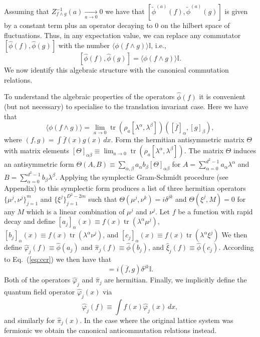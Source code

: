 \documentclass[prl,twocolumn,lengthcheck,superscriptaddress]{revtex4-1}
\newcommand{\tr}{\operatorname{tr}}
\theoremstyle{definition}
\theoremstyle{remark}
\begin{document}
Assuming that ${Z_{f\wedge g}^{-1}(a)} \underset{a\rightarrow 0}{\rightarrow} 0$ we have that $[\widetilde{\phi}^{(a)}(f), \widetilde{\phi}^{(a)}(g)]$ is given by a constant term plus an operator decaying to $0$ on the hilbert space of fluctuations. Thus, in any expectation value, we can replace any commutator $[\widehat{\phi}(f), \widehat{\phi}(g)]$ with the number $\langle \phi(f\wedge g)\rangle \mathbb{I}$, i.e., 
\begin{equation}\label{eq:ccr}
	[\widehat{\phi}(f), \widehat{\phi}(g)] = \langle \phi(f\wedge g)\rangle \mathbb{I}.
\end{equation}
We now identify this algebraic structure with the canonical commutation relations. 

To understand the algebraic properties of the operators $\widehat{\phi}(f)$ it is convenient (but not necessary) to specialise to the translation invariant case. Here we have that 
\begin{equation}
	\langle \phi(f\wedge g)\rangle = \lim_{a\rightarrow 0} \tr(\rho_a [\lambda^\alpha,\lambda^\beta]) ([\overline{f}]_\alpha,[g]_\beta), 
\end{equation}
where $(f,g) = \int \overline{f}(x)g(x)\,dx$.
 Form the hermitian antisymmetric matrix $\Theta$ with matrix elements $[\Theta]_{\alpha\beta}  \equiv \lim_{a\rightarrow 0} \tr(\rho_a [\lambda^\alpha,\lambda^\beta])$. The matrix $\Theta$ induces an antisymmetric form $\Theta(A,B) \equiv \sum_{\alpha,\beta} a_\alpha b_\beta [\Theta]_{\alpha\beta}$ for $A = \sum_{\alpha=0}^{d^2-1} a_\alpha \lambda^\alpha$ and  $B = \sum_{\alpha=0}^{d^2-1} b_\beta \lambda^\beta$. Applying the symplectic Gram-Schmidt procedure (see Appendix) to this symplectic form produces a list of three hermitian operators $\{\mu^{j}, \nu^{j}\}_{j=1}^m$ and  $\{\xi^{j}\}_{j = 1}^{D^2-2m}$ such that $\Theta(\mu^j, \nu^k) = i\delta^{jk}$ and $\Theta(\xi^j, M) = 0$ for any $M$ which is a linear combination of $\mu^j$ and $\nu^j$. Let $f$ be a function with rapid decay and define $[a_j]_\alpha(x) \equiv f(x) \tr(\lambda^\alpha\mu^j)$, $[b_j]_\alpha(x) \equiv f(x) \tr(\lambda^\alpha\nu^j)$, and $[c_j]_\alpha(x) \equiv f(x) \tr(\lambda^\alpha\xi^j)$ We then define $\widehat{\varphi}_j(f) \equiv \widehat{\phi}(a_j)$ and $\widehat{\pi}_j(f) \equiv \widehat{\phi}(b_j)$, and $\widehat{\xi}_j(f) \equiv \widehat{\phi}(c_j)$. According to Eq.~(\ref{eq:ccr}) we then have that
\begin{equation}
	[\widehat{\varphi}_j(f), \widehat{\pi}_k(g)] = i (\overline{f},g)\delta^{jk} \mathbb{I}.
\end{equation}
Both of the operators $\widehat{\varphi}_j$ and $\widehat{\pi}_j$ are hermitian.
Finally, we implicitly define the quantum field operator $\widehat{\varphi}_j(x)$ via
\begin{equation}
	\widehat{\varphi}_j(f) \equiv \int f(x)\widehat{\varphi}_j(x)\,dx,
\end{equation}
and similarly for $\widehat{\pi}_j(x)$. In the case where the original lattice system was fermionic we obtain the canonical anticommutation relations instead.
\end{document}
